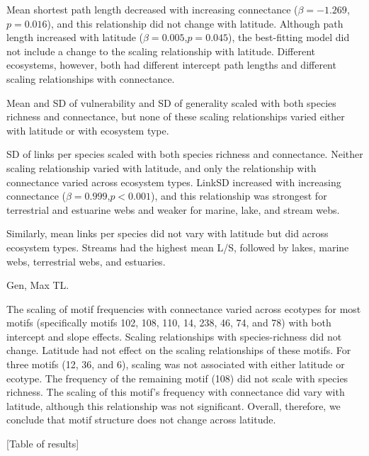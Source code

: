 Mean shortest path length decreased with increasing connectance ($\beta=-1.269$,$p=0.016$), and this relationship did not change with latitude. Although path length increased with latitude ($\beta=0.005$,$p=0.045$), the best-fitting model did not include a change to the scaling relationship with latitude. Different ecosystems, however, both had different intercept path lengths and different scaling relationships with connectance.


Mean and SD of vulnerability and SD of generality scaled with both species richness and connectance, but none of these scaling relationships varied either with latitude or with ecosystem type.


SD of links per species scaled with both species richness and connectance. Neither scaling relationship varied with latitude, and only the relationship with connectance varied across ecosystem types. LinkSD increased with increasing connectance ($\beta=0.999$,$p<0.001$), and this relationship was strongest for terrestrial and estuarine webs and weaker for marine, lake, and stream webs.


Similarly, mean links per species did not vary with latitude but did across ecosystem types. Streams had the highest mean L/S, followed by lakes, marine webs, terrestrial webs, and estuaries.


Gen, Max TL. 





The scaling of motif frequencies with connectance varied across ecotypes for
most motifs (specifically motifs 102, 108, 110, 14, 238, 46, 74, and 78) with
both intercept and slope effects. Scaling relationships with species-richness
did not change. Latitude had not effect on the scaling relationships of these
motifs. For three motifs (12, 36, and 6), scaling was not associated with
either latitude or ecotype. The frequency of the remaining motif (108) did not
scale with species richness. The scaling of this motif's frequency with
connectance did vary with latitude, although this relationship was not
significant.  Overall, therefore, we conclude that motif structure does not
change across latitude.


[Table of results]






